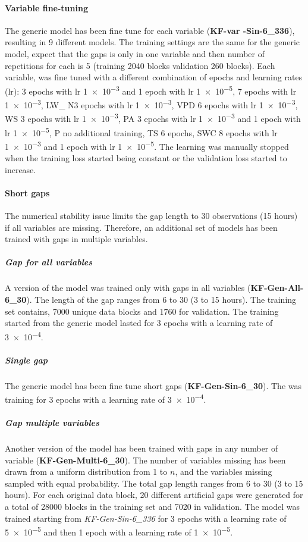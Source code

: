 \documentclass{article}
\begin{document}
\paragraph{Variable fine-tuning} The generic model has been fine tune for each variable (\textbf{KF-\textlangle var \textrangle-Sin-6\_336}), resulting in 9 different models. The training settings are the same for the generic model, expect that the gaps is only in one variable and then number of repetitions for each is 5 (training 2040 blocks validation 260 blocks). Each variable, was fine tuned with a different combination of epochs and learning rates (lr):  3 epochs with lr \num{1e-3} and 1 epoch with lr \num{1e-5},  \num{7} epochs with lr \num{1e-3}, LW\_ N\num{3} epochs with lr \num{1e-3}, VPD \num{6} epochs with lr \num{1e-3}, WS \num{3} epochs with lr \num{1e-3}, PA \num{3} epochs with lr \num{1e-3} and 1 epoch with lr \num{1e-5}, P no additional training, TS \num{6} epochs, SWC \num{8} epochs with lr \num{1e-3} and 1 epoch with lr \num{1e-5}. The learning was manually stopped when the training loss started being constant or the validation loss started to increase.

\paragraph{Short gaps} The numerical stability issue limits the gap length to 30 observations (15 hours) if all variables are missing. Therefore, an additional set of models has been trained with gaps in multiple variables.  

\subparagraph{Gap for all variables} A version of the model was trained only with gaps in all variables (\textbf{KF-Gen-All-6\_30}). The length of the gap ranges from 6 to 30 (3 to 15 hours). The training set contains, 7000 unique data blocks and 1760 for validation. The training started from the generic model lasted for 3 epochs with a learning rate of \num{3e-4}.

\subparagraph{Single gap} The generic model has been fine tune short gaps (\textbf{KF-Gen-Sin-6\_30}). The was training for 3 epochs with a learning rate of \num{3e-4}.

\subparagraph{Gap multiple variables} Another version of the model has been trained with gaps in any number of variable (\textbf{KF-Gen-Multi-6\_30}). The number of variables missing has been drawn from a uniform distribution  from 1 to $n$, and the variables missing sampled with equal probability. The total gap length ranges from 6 to 30 (3 to 15 hours). For each original data block, 20 different artificial gaps were generated for a total of 28000 blocks in the training set and 7020 in validation. The model was trained starting from \textit{KF-Gen-Sin-6\_336} for 3 epochs with a learning rate of \num{5e-5} and then 1 epoch with a learning rate of \num{1e-5}.
\end{document}
